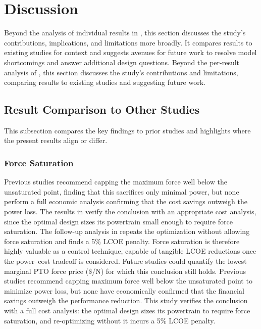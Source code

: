 \section{Discussion}\label{remdo:sec:discussion}

\ifdefined\DISSERTATION
    Beyond the analysis of individual results in , this section discusses the study's contributions, implications, and limitations more broadly.
    It compares results to existing studies for context and suggests avenues for future work to resolve model shortcomings and answer additional design questions.
\else
    Beyond the per-result analysis of , this section discusses the study's contributions and limitations, comparing results to existing studies and suggesting future work.
\fi

\subsection{Result Comparison to Other Studies }
This subsection compares the key findings to prior studies and highlights where the present results align or differ.

\subsubsection{Force Saturation}
\ifdefined\DISSERTATION
    Previous studies \cite{mcgilton_optimal_2024,coe_maybe_2021,devin_high-dimensional_2024,gaebele_tpl_2025,mccabe_force-limited_2024} recommend capping the maximum force well below the unsaturated point, finding that this sacrifices only minimal power, but none perform a full economic analysis confirming that the cost savings outweigh the power loss.
    The results in  verify the conclusion with an appropriate cost analysis, since the optimal design sizes its powertrain small enough to require force saturation.
    The follow-up analysis in  repeats the optimization without allowing force saturation and finds a 5\% LCOE penalty.
    Force saturation is therefore highly valuable as a control technique, capable of tangible LCOE reductions once the power--cost tradeoff is considered.
    Future studies could quantify the lowest marginal PTO force price (\$/N) for which this conclusion still holds.
\else
    Previous studies \cite{mcgilton_optimal_2024,coe_maybe_2021,devin_high-dimensional_2024,gaebele_tpl_2025,mccabe_force-limited_2024} recommend capping maximum force well below the unsaturated point to minimize power loss, but none have economically confirmed that the financial savings outweigh the performance reduction.
    This study verifies the conclusion with a full cost analysis: the optimal design sizes its powertrain to require force saturation, and re-optimizing without it incurs a 5\% LCOE penalty. %
\fi

